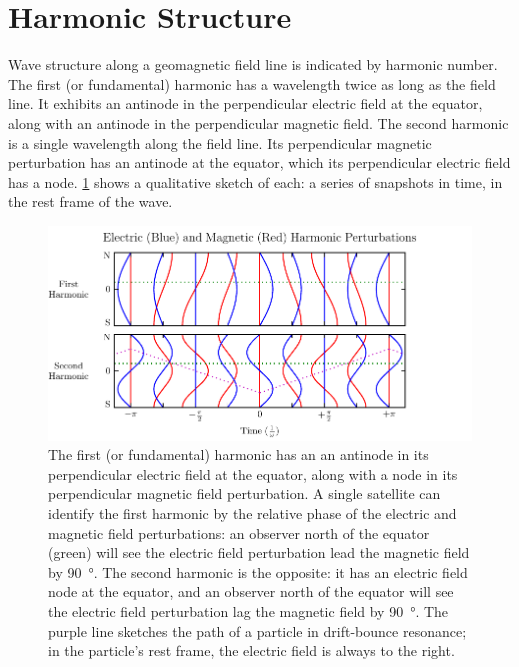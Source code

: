 
\section{Harmonic Structure}
  \label{sec_harmonics}

Wave structure along a geomagnetic field line is indicated by harmonic number. The first (or fundamental) harmonic has a wavelength twice as long as the field line. It exhibits an antinode in the perpendicular electric field at the equator, along with an antinode in the perpendicular magnetic field. The second harmonic is a single wavelength along the field line. Its perpendicular magnetic perturbation has an antinode at the equator, which its perpendicular electric field has a node. \cref{fig_harmonics} shows a qualitative sketch of each: a series of snapshots in time, in the rest frame of the wave. 

\begin{figure}[!htb]
    \centering
    \includegraphics[width=\textwidth]{figures/harmonics.pdf}
    \caption[First and Second Harmonic Resonances]{
      The first (or fundamental) harmonic has an an antinode in its perpendicular electric field at the equator, along with a node in its perpendicular magnetic field perturbation. A single satellite can identify the first harmonic by the relative phase of the electric and magnetic field perturbations: an observer north of the equator (green) will see the electric field perturbation lead the magnetic field by \SI{90}{\degree}. The second harmonic is the opposite: it has an electric field node at the equator, and an observer north of the equator will see the electric field perturbation lag the magnetic field by \SI{90}{\degree}. The purple line sketches the path of a particle in drift-bounce resonance; in the particle's rest frame, the electric field is always to the right. 
    }
    \label{fig_harmonics}
\end{figure}

